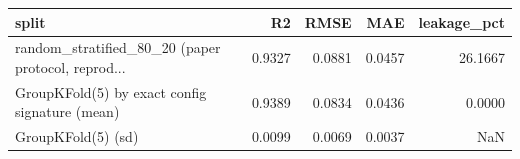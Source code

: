 \begin{tabular}{lrrrr}
\toprule
                                             split &     R2 &   RMSE &    MAE &  leakage\_pct \\
\midrule
random\_stratified\_80\_20 (paper protocol, reprod... & 0.9327 & 0.0881 & 0.0457 &      26.1667 \\
    GroupKFold(5) by exact config signature (mean) & 0.9389 & 0.0834 & 0.0436 &       0.0000 \\
                                GroupKFold(5) (sd) & 0.0099 & 0.0069 & 0.0037 &          NaN \\
\bottomrule
\end{tabular}
